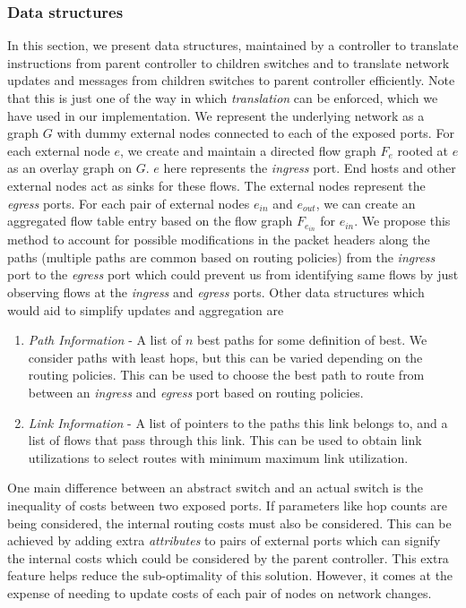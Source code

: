 \documentclass[10pt, twocolumn]{article}
\begin{document}
\subsubsection{Data structures}
\label{subsubsec:aggr-data}
In this section, we present data structures, maintained by a controller to translate instructions from parent controller to children switches and to translate network updates and messages from children switches to parent controller efficiently. Note that this is just one of the way in which \emph{translation} can be enforced, which we have used in our implementation. We represent the underlying network as a graph $G$ with dummy external nodes connected to each of the exposed ports. For each external node $e$, we create and maintain a directed flow graph $F_e$ rooted at $e$ as an overlay graph on $G$. $e$ here represents the \emph{ingress} port. End hosts and other external nodes act as sinks for these flows. The external nodes represent the \emph{egress} ports.
For each pair of external nodes $e_{in}$ and $e_{out}$, we can create an aggregated flow table entry based on the flow graph $F_{e_{in}}$ for $e_{in}$. We propose this method to account for possible modifications in the packet headers along the paths (multiple paths are common based on routing policies) from the \emph{ingress} port to the \emph{egress} port which could prevent us from identifying same flows by just observing flows at the \emph{ingress} and \emph{egress} ports.
Other data structures which would aid to simplify updates and aggregation are
\begin{enumerate}
    \item \emph{Path Information} - A list of $n$ best paths for some definition of best. We consider paths with least hops, but this can be varied depending on the routing policies. This can be used to choose the best path to route from between an \emph{ingress} and \emph{egress} port based on routing policies.
    \item \emph{Link Information} - A list of pointers to the paths this link belongs to, and a list of flows that pass through this link. This can be used to obtain link utilizations to select routes with minimum maximum link utilization.
\end{enumerate}
One main difference between an abstract switch and an actual switch is the inequality of costs between two exposed ports. If parameters like hop counts are being considered, the internal routing costs must also be considered. This can be achieved by adding extra \emph{attributes} to pairs of external ports which can signify the internal costs which could be considered by the parent controller. This extra feature helps reduce the sub-optimality of this solution. However, it comes at the expense of needing to update costs of each pair of nodes on network changes.
\end{document}
